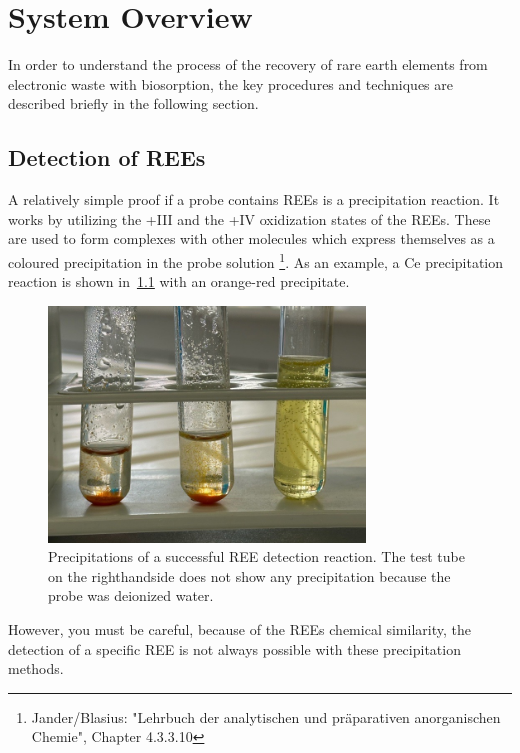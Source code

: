 \chapter{System Overview}

In order to understand the process of the recovery of rare earth elements from electronic waste with biosorption, the key procedures and techniques are described briefly in the following section.

\section{Detection of REEs\authorA}

A relatively simple proof if a probe contains REEs is a precipitation reaction.
It works by utilizing the +III and the +IV oxidization states of the REEs.
These are used to form complexes with other molecules which express themselves as a coloured precipitation in the probe solution \footnote{Jander/Blasius: "Lehrbuch der analytischen und präparativen anorganischen Chemie", Chapter 4.3.3.10}.
As an example, a Ce precipitation reaction is shown in~\ref{fig:cer_precipitation_cropped} with an orange-red precipitate.

\begin{figure}[H]
    \centering
    \includegraphics[width=0.75\textwidth]{./media/images/ree_precipitation_reaction_cropped}
    \caption{Precipitations of a successful REE detection reaction. The test tube on the righthandside does not show any precipitation because the probe was deionized water.}
    \label{fig:cer_precipitation_cropped}
\end{figure}

However, you must be careful, because of the REEs chemical similarity, the detection of a specific REE is not always possible with these precipitation methods.


